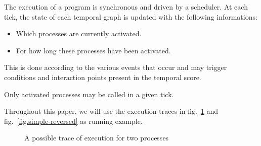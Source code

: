 \documentclass{article}
\begin{document}
    The execution of a program is synchronous and driven by a scheduler.
    At each tick, the state of each temporal graph is updated with the following informations:
    
    \begin{itemize}
        \item Which processes are currently activated.
        \item For how long these processes have been activated.
    \end{itemize}

    This is done according to the various events that occur and may trigger conditions and interaction points present in the temporal score.
    
    Only activated processes may be called in a given tick.
    
    

    
    Throughout this paper, we will use the execution traces in fig.~\ref{fig.simple} and fig.~\ref{fig.simple-reversed} as running example. 
    \begin{figure}
        \centering
        \caption{A possible trace of execution for two processes}
        \label{fig.simple}
    \end{figure}
	
\end{document}
